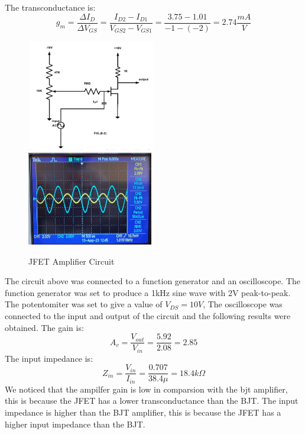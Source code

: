 \documentclass[12pt]{article}
\begin{document}
The transconductance is:
\begin{equation}
    g_m = \frac{\Delta I_D}{\Delta V_{GS}} = \frac{I_{D2} - I_{D1}}{V_{GS2} - V_{GS1}} = \frac{3.75 - 1.01}{-1 - (-2)} = 2.74 \frac{mA}{V}
    \label{eq:gm}
\end{equation}
\begin{figure}[H]
    \centering
    \includegraphics[width=0.5\textwidth]{assets/main/2023-08-25-18-20-27.png}
    \includegraphics[width=0.49\textwidth]{assets//main/2023-08-25-18-29-02.png}
    \caption{JFET Amplifier Circuit}
\end{figure}
The circuit above was connected to a function generator and an oscilloscope. The function generator was set to produce a 1kHz sine wave with 2V peak-to-peak. The potentomiter was set to give a value of $V_{DS} = 10V$, The oscilloscope was connected to the input and output of the circuit and the following results were obtained.
The gain is:
\begin{equation}
    A_v = \frac{V_{out}}{V_{in}} = \frac{5.92}{2.08} = 2.85
\end{equation}
The input impedance is:
\begin{equation}
    Z_{in} = \frac{V_{in}}{I_{in}} = \frac{0.707}{38.4 \mu} =  18.4 k\Omega
\end{equation}
We noticed that the ampilfer gain is low in comparsion with the bjt amplifier, this is because the JFET has a lower transconductance than the BJT. The input impedance is higher than the BJT amplifier, this is because the JFET has a higher input impedance than the BJT.
\end{document}
